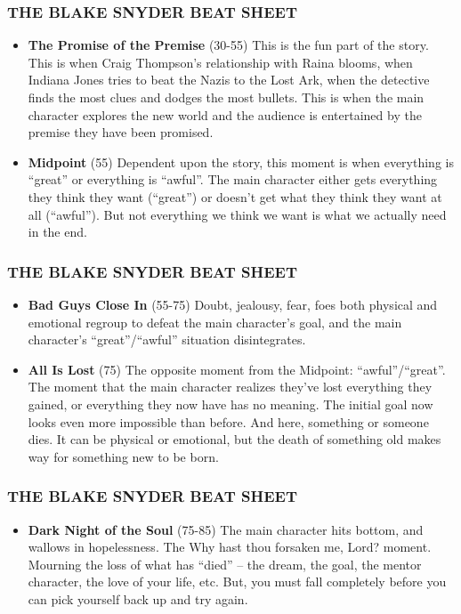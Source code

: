 \documentclass{beamer}
\begin{document}
\begin{frame}\frametitle{THE BLAKE SNYDER BEAT SHEET}
\begin{itemize}
\item {\bf 
The Promise of the Premise} (30-55) This is the fun part of the story. This is
  when Craig Thompson's relationship with Raina blooms, when Indiana
  Jones tries to beat the Nazis to the Lost Ark, when the detective
  finds the most clues and dodges the most bullets. This is when the
  main character explores the new world and the audience is
  entertained by the premise they have been promised. 
\item {\bf Midpoint} (55)  Dependent upon the story, this moment is when
  everything is “great” or everything is “awful”. The main character
  either gets everything they think they want (“great”) or doesn’t get
  what they think they want at all (“awful”). But not everything we
  think we want is what we actually need in the end. 
\end{itemize}
\end{frame}
\begin{frame}\frametitle{THE BLAKE SNYDER BEAT SHEET}
\begin{itemize}
\item {\bf Bad Guys Close In} (55-75)  Doubt, jealousy, fear, foes both
  physical and emotional regroup to defeat the main character’s goal,
  and the main character’s “great”/“awful” situation disintegrates. 
\item {\bf All Is Lost} (75) The opposite moment from the Midpoint:
  “awful”/“great”. The moment that the main character realizes they've
  lost everything they gained, or everything they now have has no
  meaning. The initial goal now looks even more impossible than
  before. And here, something or someone dies. It can be physical or
  emotional, but the death of something old makes way for something
  new to be born. 
\end{itemize}
\end{frame}
\begin{frame}\frametitle{THE BLAKE SNYDER BEAT SHEET}
\begin{itemize}
\item {\bf Dark Night of the Soul} (75-85) The main character hits bottom,
  and wallows in hopelessness. The Why hast thou forsaken me, Lord?
  moment. Mourning the loss of what has “died” – the dream, the goal,
  the mentor character, the love of your life, etc. But, you must fall
  completely before you can pick yourself back up and try again. 
\end{itemize}
\end{frame}
\end{document}
